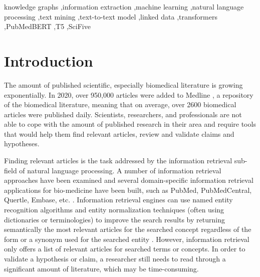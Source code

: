 \documentclass[final,12pt,3p,times,twocolumn,authoryear]{elsarticle}
\begin{document}
\begin{frontmatter}
\begin{abstract}
\end{abstract}









\begin{keyword}






knowledge graphs \sep information extraction \sep machine learning \sep natural language processing \sep text mining \sep text-to-text model \sep linked data \sep transformers \sep PubMedBERT \sep T5 \sep SciFive

\end{keyword}

\end{frontmatter}



\section{Introduction}

The amount of published scientific, especially biomedical literature is growing exponentially. In 2020, over 950,000 articles were added to Medline \citep{Medline2020}, a repository of the biomedical literature, meaning that on average, over 2600 biomedical articles were published daily. Scientists, researchers, and professionals are not able to cope with the amount of published research in their area and require tools that would help them find relevant articles, review and validate claims and hypotheses.  

Finding relevant articles is the task addressed by the information retrieval sub-field of natural language processing. A number of information retrieval approaches have been examined and several domain-specific information retrieval applications for bio-medicine have been built, such as PubMed, PubMedCentral, Quertle, Embase, etc. \citep{canese2013pubmed,roberts2001pubmed,coppernoll2011quertle}. Information retrieval engines can use named entity recognition algorithms and entity normalization techniques (often using dictionaries or terminologies) to improve the search results by returning semantically the most relevant articles for the searched concept regardless of the form or a synonym used for the searched entity \citep{jonnalagadda2010nemo,jonnagaddala2015recognition,hakala2016syntactic}. However, information retrieval only offers a list of relevant articles for searched terms or concepts. In order to validate a hypothesis or claim, a researcher still needs to read through a significant amount of literature, which may be time-consuming. 
\end{document}
